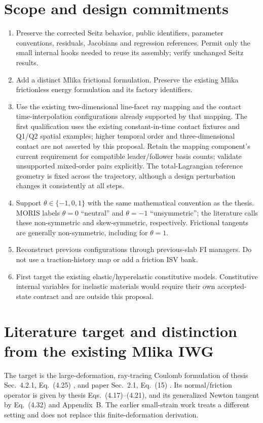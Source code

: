 \documentclass[11pt,a4paper]{article}
\begin{document}
\section{Scope and design commitments}
\begin{enumerate}[leftmargin=*]
\item Preserve the corrected Seitz behavior, public identifiers, parameter
conventions, residuals, Jacobians and regression references. Permit only the
small internal hooks needed to reuse its assembly; verify unchanged Seitz results.
\item Add a distinct Mlika frictional formulation. Preserve the existing Mlika
frictionless energy formulation and its factory identifiers.
\item Use the existing two-dimensional line-facet ray mapping and the contact
time-interpolation configurations already supported by that mapping. The first
qualification uses the existing constant-in-time contact fixtures and Q1/Q2
spatial examples; higher temporal order and three-dimensional contact are not
asserted by this proposal. Retain the mapping component's current requirement
for compatible leader/follower basis counts; validate unsupported mixed-order
pairs explicitly. The total-Lagrangian reference geometry is fixed across the
trajectory, although a design perturbation changes it consistently at all steps.
\item Support $\theta\in\{-1,0,1\}$ with the same mathematical convention as the
thesis. MORIS labels $\theta=0$ ``neutral'' and $\theta=-1$ ``unsymmetric'';
the literature calls these non-symmetric and skew-symmetric, respectively.
Frictional tangents are generally non-symmetric, including for $\theta=1$.
\item Reconstruct previous configurations through previous-slab FI managers.
Do not use a traction-history map or add a friction ISV bank.
\item First target the existing elastic/hyperelastic constitutive models.
Constitutive internal variables for inelastic materials would require their own
accepted-state contract and are outside this proposal.
\end{enumerate}

\section{Literature target and distinction from the existing Mlika IWG}
The target is the large-deformation, ray-tracing Coulomb formulation of thesis
Sec.~4.2.1, Eq.~(4.25) \cite{mlika2018}, and paper Sec.~2.1, Eq.~(15)
\cite{mlika2017}. Its normal/friction operator is given by thesis
Eqs.~(4.17)--(4.21), and its generalized Newton tangent by Eq.~(4.32) and
Appendix~B. The earlier small-strain work \cite{chouly2018} treats a different
setting and does not replace this finite-deformation derivation.
\end{document}
